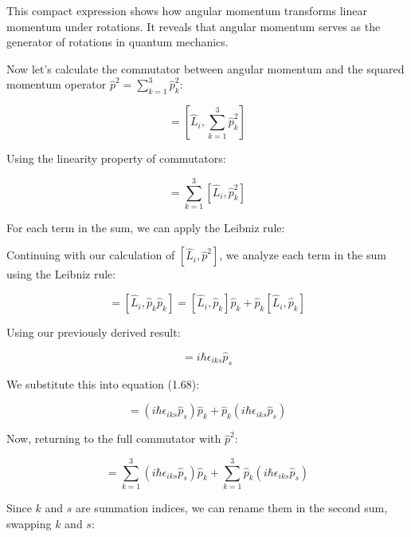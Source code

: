 \documentclass[italian]{HKNdocument}
\begin{document}
This compact expression shows how angular momentum transforms linear momentum under rotations. It reveals that angular momentum serves as the generator of rotations in quantum mechanics.

Now let's calculate the commutator between angular momentum and the squared momentum operator $\hat{p}^2 = \sum_{k=1}^3 \hat{p}_k^2$:

\begin{equation*}
[\hat{L}_i, \hat{p}^2] = \left[\hat{L}_i, \sum_{k=1}^3 \hat{p}_k^2\right] \tag{1.66}
\end{equation*}

Using the linearity property of commutators:

\begin{equation*}
[\hat{L}_i, \hat{p}^2] = \sum_{k=1}^3 [\hat{L}_i, \hat{p}_k^2] \tag{1.67}
\end{equation*}

For each term in the sum, we can apply the Leibniz rule:

Continuing with our calculation of $[\hat{L}_i, \hat{p}^2]$, we analyze each term in the sum using the Leibniz rule:

\begin{equation*}
[\hat{L}_i, \hat{p}_k^2] = [\hat{L}_i, \hat{p}_k\hat{p}_k] = [\hat{L}_i, \hat{p}_k]\hat{p}_k + \hat{p}_k[\hat{L}_i, \hat{p}_k] \tag{1.68}
\end{equation*}

Using our previously derived result:

\begin{equation*}
[\hat{L}_i, \hat{p}_k] = i\hbar\epsilon_{iks}\hat{p}_s \tag{1.69}
\end{equation*}

We substitute this into equation (1.68):

\begin{equation*}
[\hat{L}_i, \hat{p}_k^2] = (i\hbar\epsilon_{iks}\hat{p}_s)\hat{p}_k + \hat{p}_k(i\hbar\epsilon_{iks}\hat{p}_s) \tag{1.70}
\end{equation*}

Now, returning to the full commutator with $\hat{p}^2$:

\begin{equation*}
[\hat{L}_i, \hat{p}^2] = \sum_{k=1}^{3}(i\hbar\epsilon_{iks}\hat{p}_s)\hat{p}_k + \sum_{k=1}^{3}\hat{p}_k(i\hbar\epsilon_{iks}\hat{p}_s) \tag{1.71}
\end{equation*}

Since $k$ and $s$ are summation indices, we can rename them in the second sum, swapping $k$ and $s$:
\end{document}
